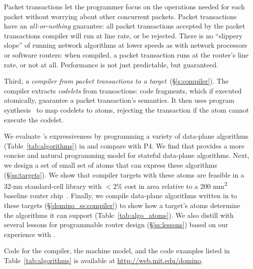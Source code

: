 Packet transactions let the programmer focus on the operations needed for each
packet without worrying about other concurrent packets. Packet transactions
have an \textit{all-or-nothing} guarantee: all packet transactions accepted by
the packet transactions compiler will run at line rate, or be rejected.  There
is no ``slippery slope'' of running network algorithms at lower speeds as with
network processors or software routers: when compiled, a packet transaction
runs at the router's line rate, or not at all.  Performance is not just
predictable, but guaranteed.

Third, {\em a compiler from \pktlanguage packet transactions to a \absmachine
target}~(\S\ref{s:compiler}). The \pktlanguage compiler extracts {\em codelets}
from  transactions: code fragments, which if executed atomically, guarantee a
packet transaction's semantics. It then uses program
synthesis~\cite{sketch_asplos} to map codelets to atoms, rejecting the
transaction if the atom cannot execute the codelet.

We evaluate \pktlanguage's expressiveness by programming a variety of
data-plane algorithms (Table~\ref{tab:algorithms}) in \pktlanguage and compare with
P4. We find that \pktlanguage provides a more concise and natural programming
model for stateful data-plane algorithms.  Next, we design a set of small set
of atoms that can express these algorithms (\S\ref{ss:targets}).  We show that
compiler targets with these atoms are feasible in a 32-nm standard-cell library
with $< 2\%$ cost in area relative to a 200 \si{\milli\metre\squared} baseline
router chip~\cite{gibb_parsing}.  Finally, we compile data-plane algorithms
written in \pktlanguage to these targets (\S\ref{domino_ss:compiler}) to show
how a target's atoms determine the algorithms it can support (Table~\ref{tab:algo_atoms}). We also distill
with several lessons for programmable router design (\S\ref{ss:lessons}) based
on our experience with \pktlanguage.

Code for the \pktlanguage compiler, the \absmachine machine model, and the code
examples listed in Table~\ref{tab:algorithms} is available at
\url{http://web.mit.edu/domino}.
